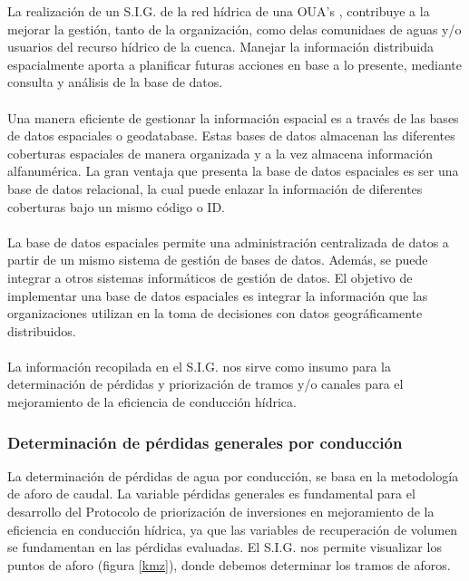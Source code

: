 \documentclass[]{article}
\begin{document}
La realización de un S.I.G. de la red hídrica de una OUA's , contribuye a la mejorar la gestión, tanto de la organización, como delas comunidaes de aguas y/o usuarios del recurso hídrico de la cuenca. Manejar la información distribuida espacialmente aporta a planificar futuras acciones en base a lo presente, mediante consulta y análisis de la base de datos.\\
\\
Una manera eficiente de gestionar la información espacial es a través de las bases de datos espaciales o geodatabase. Estas bases de datos almacenan las diferentes coberturas espaciales de manera organizada y a la vez almacena información alfanumérica. La gran ventaja que presenta la base de datos espaciales es ser una base de datos relacional, la cual puede enlazar la información de diferentes coberturas bajo un mismo código o ID.\\
\\
La base de datos espaciales permite una administración centralizada de datos a partir de un mismo sistema de gestión de bases de datos. Además, se puede integrar a otros sistemas informáticos de gestión de datos. El objetivo de implementar una base de datos espaciales es integrar la información que las organizaciones utilizan en la toma de decisiones con datos geográficamente distribuidos.\\
\\
La información recopilada en el S.I.G. nos sirve como insumo para la determinación de pérdidas y priorización de tramos y/o canales para el mejoramiento de la eficiencia de conducción hídrica.

\subsubsection{Determinación de pérdidas generales por conducción}

La determinación de pérdidas de agua por conducción, se basa en la metodología de aforo de caudal. La variable pérdidas generales es fundamental para el desarrollo del Protocolo de priorización de inversiones en mejoramiento de la eficiencia en conducción hídrica, ya que las variables de recuperación de volumen se fundamentan en las pérdidas evaluadas. El S.I.G. nos permite visualizar los puntos de aforo (figura \ref{kmz}), donde debemos determinar los tramos de aforos.
\end{document}
